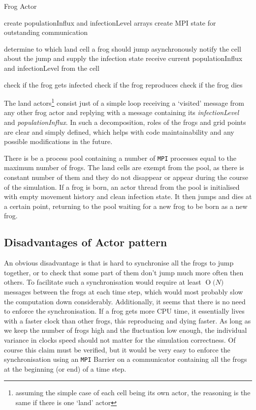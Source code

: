 \documentclass[11pt,a4paper]{article}
\newcommand{\BigO}[1]{\ensuremath{\operatorname{O}\bigl(#1\bigr)}}
\begin{document}
\begin{algorithm}
    \caption{Frog Actor}\label{frog_actor}
    \begin{algorithmic}[1]
        \State create populationInflux and infectionLevel arrays
        \State create MPI state for outstanding communication

            \State determine to which land cell a frog should jump
            \State asynchronously notify the cell about the jump and supply the infection state
            \State receive current populationInflux and infectionLevel from the cell

            \State check if the frog gets infected
                \State check if the frog reproduces
            \EndIf
                \State check if the frog dies
            \EndIf
        \EndWhile
    \end{algorithmic}
\end{algorithm}

The land actors\footnote{assuming the simple case of each cell being its own actor, the reasoning is the same if there is one `land' actor} consist just of a simple loop receiving a `visited' message from any other frog actor and replying with a message containing its \textit{infectionLevel} and \textit{populationInflux}.
In such a decomposition, roles of the frogs and grid points are clear and simply defined, which helps with code maintainability and any possible modifications in the future.

There is be a process pool containing a number of \texttt{MPI} processes equal to the maximum number of frogs.
The land cells are exempt from the pool, as there is constant number of them and they do not disappear or appear during the course of the simulation.
If a frog is born, an actor thread from the pool is initialised with empty movement history and clean infection state.
It then jumps and dies at a certain point, returning to the pool waiting for a new frog to be born as a new frog.

\subsection{Disadvantages of Actor pattern}
An obvious disadvantage is that is hard to synchronise all the frogs to jump together, or to check that some part of them don't jump much more often then others.
To facilitate such a synchronisation would require at least \BigO{N} messages between the frogs at each time step, which would most probably slow the computation down considerably. 
Additionally, it seems that there is no need to enforce the synchronisation.
If a frog gets more CPU time, it essentially lives with a faster clock than other frogs, this reproducing and dying faster.
As long as we keep the number of frogs high and the fluctuation low enough, the individual variance in clocks speed should not matter for the simulation correctness.
Of course this claim must be verified, but it would be very easy to enforce the synchronisation using an \texttt{MPI} Barrier on a communicator containing all the frogs at the beginning (or end) of a time step.
\end{document}
